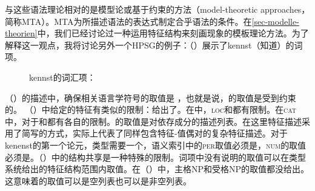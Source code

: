 与这些语法理论相对的是模型论或基于约束的方法（model-theoretic approaches，简称MTA）。MTA为所描述语法的表达式制定合乎语法的条件。在\ref{sec-modelle-theorien}中，我们已经讨论过一种运用特征结构来刻画现象的模板理论方法。为了解释这一观点，我将讨论另外一个HPSG的例子：（）展示了kennst（知道）的词项。
\begin{figure}
\eas
kennst的词汇项：\\
\label{le-kennst-mts}%
\zs
\vspace{-\baselineskip}
\end{figure}
（）的描述中，确保相关语言学符号的\phonvc 取值是 ，也就是说，\phonc 的取值是受到约束的。 （）中给定的特征有类似的限制：给出了\synsemvc。在\synsemc 中，\textsc{loc}和\nonlocvc 都有限制。在\textsc{cat}中，对于\headc 和\subcatc 都有各自的限制。\subcatc 的取值是对依存成分的描述列表。在这里特征描述采用了简写的方式，实际上代表了同样包含特征-值偶对的复杂特征描述。对于kenenst的第一个论元，类型需要一个\headvc，语义索引中的\textsc{per}取值必须是，\textsc{num}的取值必须是。（）中的结构共享是一种特殊的限制。词项中没有说明的取值可以在类型系统给出的特征结构范围内取值。在（）中，主格NP和受格NP的\slashvc 取值都没给出。这意味着\slaschc 的取值可以是空列表也可以是非空列表。
